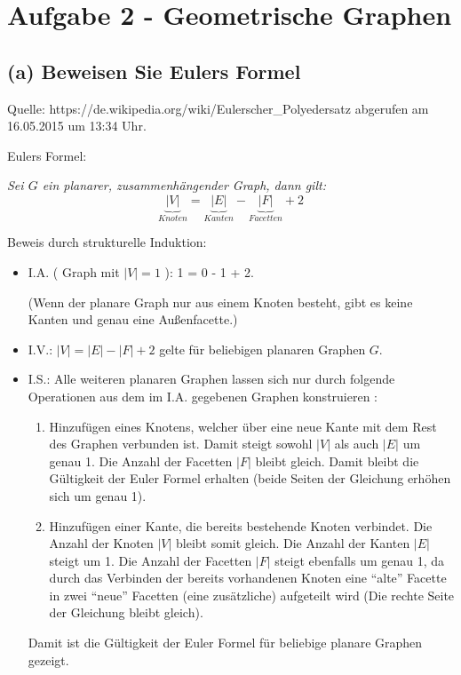 \documentclass[a4paper]{article}
\begin{document}
\section*{Aufgabe 2 - Geometrische Graphen}

\subsection*{(a) Beweisen Sie Eulers Formel}
Quelle: https://de.wikipedia.org/wiki/Eulerscher\_Polyedersatz abgerufen am 16.05.2015 um 13:34 Uhr.

Eulers Formel:

\textit{Sei $G$ ein planarer, zusammenhängender Graph, dann gilt:}
 $$\underbrace{|V|}_{Knoten} = \underbrace{|E|}_{Kanten} - \underbrace{|F|}_{Facetten} + 2 $$

Beweis durch strukturelle Induktion:

\begin{itemize}
  \item I.A. ( Graph mit $|V| = 1$ ): 1 = 0 - 1 + 2. \checkmark
  
	(Wenn der planare Graph nur aus einem Knoten besteht, gibt es keine Kanten und genau
	eine Außenfacette.)
  
  \item I.V.: $|V| = |E| - |F| + 2 $ gelte für beliebigen planaren Graphen $G$.
  \item I.S.: Alle weiteren planaren Graphen lassen sich nur durch folgende Operationen aus dem im I.A. gegebenen Graphen konstruieren :
  	\begin{enumerate}
  		\item Hinzufügen eines Knotens, welcher über eine neue Kante mit dem Rest des Graphen verbunden ist. Damit steigt sowohl $|V|$ als auch $|E|$ um genau 1. Die Anzahl
  		der Facetten $|F|$ bleibt gleich. Damit bleibt die Gültigkeit der Euler Formel erhalten (beide Seiten der Gleichung erhöhen sich um genau 1). 
  		\item Hinzufügen einer Kante, die bereits bestehende Knoten verbindet. Die Anzahl
  		der Knoten $|V|$ bleibt somit gleich. Die Anzahl der Kanten $|E|$ steigt um 1. 
  		Die Anzahl der Facetten $|F|$ steigt ebenfalls um genau 1, da durch das Verbinden
  		der bereits vorhandenen Knoten eine "`alte"' Facette in zwei "`neue"' Facetten
  		(eine zusätzliche) aufgeteilt wird (Die rechte Seite der Gleichung bleibt gleich).
  		
	\end{enumerate}  
	Damit ist die Gültigkeit der Euler Formel für beliebige planare Graphen gezeigt. \checkmark		  
\end{itemize}
\end{document}
